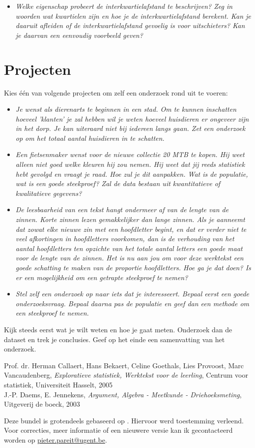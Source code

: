 \documentclass[11pt]{article}
\newcommand{\vraag}[2]{\begin{itemize}\item {\it #1} \vspace*{#2}\end{itemize}}
\begin{document}
\vraag{Welke eigenschap probeert de interkwartielafstand te beschrijven? Zeg in woorden wat
kwartielen zijn en hoe je de interkwartielafstand berekent. Kan je daaruit afleiden of de
interkwartielafstand gevoelig is voor uitschieters? Kan je daarvan een eenvoudig voorbeeld
geven?}{8cm}

\section{Projecten}

Kies één van volgende projecten om zelf een onderzoek rond uit te voeren:

\vraag{Je wenst als dierenarts te beginnen in een stad. Om te kunnen inschatten hoeveel
'klanten' je zal hebben wil je weten hoeveel huisdieren er ongeveer zijn in het dorp. Je
kan uiteraard niet bij iedereen langs gaan. Zet een onderzoek op om het totaal aantal
huisdieren in te schatten.}{1cm}


\vraag{Een fietsenmaker wenst voor de nieuwe collectie 20 MTB te kopen. Hij weet alleen
niet goed welke kleuren hij zou nemen. Hij weet dat jij reeds statistiek hebt gevolgd en vraagt
je raad. Hoe zul je dit aanpakken. Wat is de populatie, wat is een goede steekproef? Zal de
data bestaan uit kwantitatieve of kwalitatieve gegevens?}{1cm}

\vraag{De leesbaarheid van een tekst hangt ondermeer af van de lengte van de zinnen. Korte zinnen
lezen gemakkelijker dan lange zinnen. Als je aanneemt dat zowat elke nieuwe zin met een
hoofdletter begint, en dat er verder niet te veel afkortingen in hoofdletters voorkomen, dan is
de verhouding van het aantal hoofdletters ten opzichte van het totale aantal letters een goede
maat voor de lengte van de zinnen. Het is nu aan jou om voor deze werktekst een goede schatting te
maken van de proportie hoofdletters. Hoe ga je dat doen? Is er een mogelijkheid om een getrapte
steekproef te nemen?}{1cm}

\vraag{Stel zelf een onderzoek op naar iets dat je interesseert. Bepaal eerst een goede
onderzoeksvraag. Bepaal daarna pas de populatie en geef dan een methode om een steekproef
te nemen.}{1cm}

Kijk steeds eerst wat je wilt weten en hoe je gaat meten. Onderzoek dan de dataset en trek je
conclusies. Geef op het einde een samenvatting van het onderzoek.

\begin{thebibliography}{1}
\label{1} Prof. dr. Herman Callaert, Hans Bekaert, Celine Goethals, Lies Provoost, Marc Vancaudenberg, \textit{Exploratieve statistiek, Werktekst voor de leerling}, Centrum voor statistiek, Universiteit Hasselt, 2005\\
\label{2} J.-P. Daems, E. Jennekens, \textit{Argument, Algebra - Meetkunde - Driehoeksmeting}, Uitgeverij de boeck, 2003\\
\end{thebibliography}

Deze bundel is grotendeels gebaseerd op \cite{1}. Hiervoor werd toestemming verleend. Voor correcties, meer informatie of een nieuwere versie kan ik gecontacteerd worden op \href{mailto:pieter.pareit@ugent.be}{pieter.pareit@ugent.be}.
\end{document}
